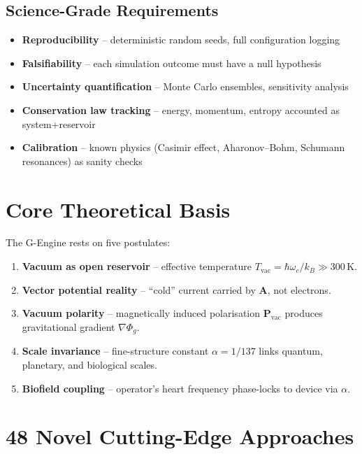 \documentclass[11pt]{article}
\begin{document}
\subsection{Science-Grade Requirements}
\begin{itemize}[nosep]
    \item \textbf{Reproducibility} -- deterministic random seeds, full configuration logging
    \item \textbf{Falsifiability} -- each simulation outcome must have a null hypothesis
    \item \textbf{Uncertainty quantification} -- Monte Carlo ensembles, sensitivity analysis
    \item \textbf{Conservation law tracking} -- energy, momentum, entropy accounted as system+reservoir
    \item \textbf{Calibration} -- known physics (Casimir effect, Aharonov--Bohm, Schumann resonances) as sanity checks
\end{itemize}

\section{Core Theoretical Basis}
The G-Engine rests on five postulates:
\begin{enumerate}[nosep]
    \item \textbf{Vacuum as open reservoir} -- effective temperature $T_{\text{vac}} = \hbar\omega_c/k_B \gg 300\,$K.
    \item \textbf{Vector potential reality} -- ``cold'' current carried by $\mathbf{A}$, not electrons.
    \item \textbf{Vacuum polarity} -- magnetically induced polarisation $\mathbf{P}_{\text{vac}}$ produces gravitational gradient $\nabla\Phi_g$.
    \item \textbf{Scale invariance} -- fine-structure constant $\alpha = 1/137$ links quantum, planetary, and biological scales.
    \item \textbf{Biofield coupling} -- operator's heart frequency phase-locks to device via $\alpha$.
\end{enumerate}

\section{48 Novel Cutting-Edge Approaches}
\end{document}
